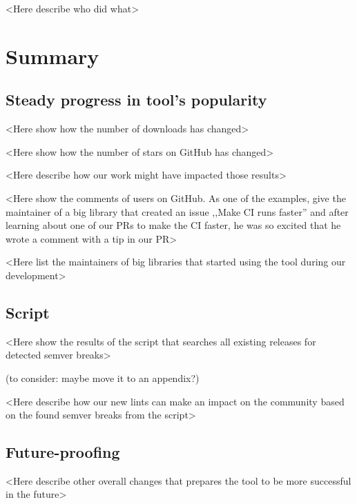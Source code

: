 \documentclass[licencjacka,en]{pracamgr}
\begin{document}
<Here describe who did what>



\chapter{Summary}\label{r:summary}

\section{Steady progress in tool's popularity}

<Here show how the number of downloads has changed>

<Here show how the number of stars on GitHub has changed>

<Here describe how our work might have impacted those results>

<Here show the comments of users on GitHub.
As one of the examples, give the maintainer of a big
library that created an issue ,,Make CI runs faster''
and after learning about one of our PRs to make the CI faster,
he was so excited that he wrote a comment with a tip in our PR>

<Here list the maintainers of big libraries that started using the tool during our development>


\section{Script}

<Here show the results of the script that searches all existing releases for detected semver breaks>

(to consider: maybe move it to an appendix?)

<Here describe how our new lints can make an impact on the community based on the found semver breaks from the script>


\section{Future-proofing}

<Here describe other overall changes that prepares the tool to be more successful in the future>



\appendix
\end{document}

